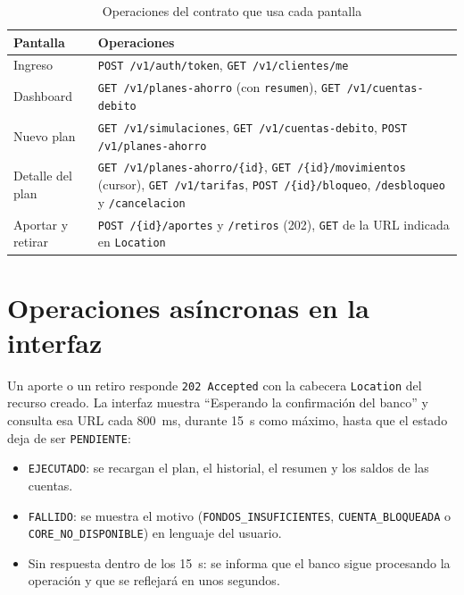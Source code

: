 \begin{table}[H]
\centering
\caption{Operaciones del contrato que usa cada pantalla}\label{tab:front-pantallas}
\begin{tabularx}{\linewidth}{@{}>{\raggedright}p{3.2cm} X@{}}
\toprule
\textbf{Pantalla} & \textbf{Operaciones} \\
\midrule
Ingreso & \texttt{POST /v1/auth/token}, \texttt{GET /v1/clientes/me} \\
Dashboard & \texttt{GET /v1/planes-ahorro} (con \texttt{resumen}), \texttt{GET /v1/cuentas-debito} \\
Nuevo plan & \texttt{GET /v1/simulaciones}, \texttt{GET /v1/cuentas-debito}, \texttt{POST /v1/planes-ahorro} \\
Detalle del plan & \texttt{GET /v1/planes-ahorro/\{id\}}, \texttt{GET /\{id\}/movimientos} (cursor), \texttt{GET /v1/tarifas}, \texttt{POST /\{id\}/bloqueo}, \texttt{/desbloqueo} y \texttt{/cancelacion} \\
Aportar y retirar & \texttt{POST /\{id\}/aportes} y \texttt{/retiros} (202), \texttt{GET} de la URL indicada en \texttt{Location} \\
\bottomrule
\end{tabularx}
\end{table}

\section{Operaciones asíncronas en la interfaz}

Un aporte o un retiro responde \texttt{202 Accepted} con la cabecera \texttt{Location} del recurso creado. La interfaz muestra ``Esperando la confirmación del banco'' y consulta esa URL cada 800~ms, durante 15~s como máximo, hasta que el estado deja de ser \texttt{PENDIENTE}:

\begin{itemize}
  \item \texttt{EJECUTADO}: se recargan el plan, el historial, el resumen y los saldos de las cuentas.
  \item \texttt{FALLIDO}: se muestra el motivo (\texttt{FONDOS\_\allowbreak{}INSUFICIENTES}, \texttt{CUENTA\_\allowbreak{}BLOQUEADA} o \texttt{CORE\_\allowbreak{}NO\_\allowbreak{}DISPONIBLE}) en lenguaje del usuario.
  \item Sin respuesta dentro de los 15~s: se informa que el banco sigue procesando la operación y que se reflejará en unos segundos.
\end{itemize}

